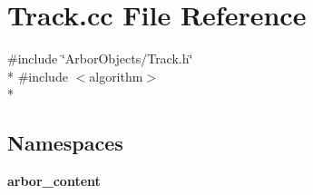 \section{Track.\+cc File Reference}
\label{Track_8cc}
{\ttfamily \#include \char`\"{}Arbor\+Objects/\+Track.\+h\char`\"{}}\\*
{\ttfamily \#include $<$algorithm$>$}\\*
\subsection*{Namespaces}
\begin{DoxyCompactItemize}
\item 
 {\bf arbor\+\_\+content}
\end{DoxyCompactItemize}
